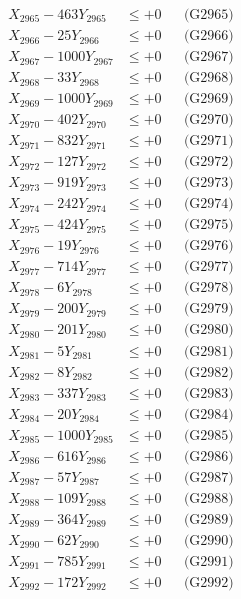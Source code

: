 \documentclass[a4paper,10pt]{article}
\begin{document}
{\begin{align}
X_{2965} - 463Y_{2965} &\leq +0 && \text{(G2965)} \\
X_{2966} - 25Y_{2966} &\leq +0 && \text{(G2966)} \\
X_{2967} - 1000Y_{2967} &\leq +0 && \text{(G2967)} \\
X_{2968} - 33Y_{2968} &\leq +0 && \text{(G2968)} \\
X_{2969} - 1000Y_{2969} &\leq +0 && \text{(G2969)} \\
X_{2970} - 402Y_{2970} &\leq +0 && \text{(G2970)} \\
\allowbreak
X_{2971} - 832Y_{2971} &\leq +0 && \text{(G2971)} \\
X_{2972} - 127Y_{2972} &\leq +0 && \text{(G2972)} \\
X_{2973} - 919Y_{2973} &\leq +0 && \text{(G2973)} \\
X_{2974} - 242Y_{2974} &\leq +0 && \text{(G2974)} \\
X_{2975} - 424Y_{2975} &\leq +0 && \text{(G2975)} \\
X_{2976} - 19Y_{2976} &\leq +0 && \text{(G2976)} \\
X_{2977} - 714Y_{2977} &\leq +0 && \text{(G2977)} \\
X_{2978} - 6Y_{2978} &\leq +0 && \text{(G2978)} \\
X_{2979} - 200Y_{2979} &\leq +0 && \text{(G2979)} \\
X_{2980} - 201Y_{2980} &\leq +0 && \text{(G2980)} \\
\allowbreak
X_{2981} - 5Y_{2981} &\leq +0 && \text{(G2981)} \\
X_{2982} - 8Y_{2982} &\leq +0 && \text{(G2982)} \\
X_{2983} - 337Y_{2983} &\leq +0 && \text{(G2983)} \\
X_{2984} - 20Y_{2984} &\leq +0 && \text{(G2984)} \\
X_{2985} - 1000Y_{2985} &\leq +0 && \text{(G2985)} \\
X_{2986} - 616Y_{2986} &\leq +0 && \text{(G2986)} \\
X_{2987} - 57Y_{2987} &\leq +0 && \text{(G2987)} \\
X_{2988} - 109Y_{2988} &\leq +0 && \text{(G2988)} \\
X_{2989} - 364Y_{2989} &\leq +0 && \text{(G2989)} \\
X_{2990} - 62Y_{2990} &\leq +0 && \text{(G2990)} \\
\allowbreak
X_{2991} - 785Y_{2991} &\leq +0 && \text{(G2991)} \\
X_{2992} - 172Y_{2992} &\leq +0 && \text{(G2992)} \\

\end{align}}
\end{document}
